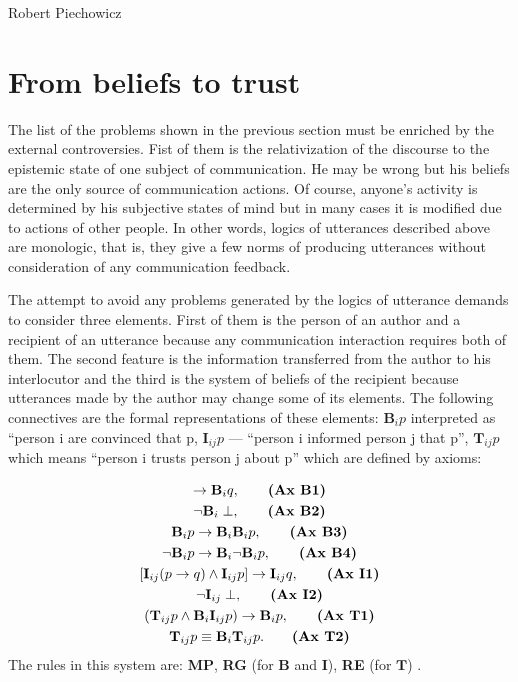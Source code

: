 \begin{artengenv}{Robert Piechowicz}
\section{From beliefs to trust}

\indent The list of the problems shown in the previous section must be enriched by the external controversies. Fist of them is the relativization of the discourse to the epistemic state of one subject of communication. He may be wrong but his beliefs are the only source of communication actions. Of course, anyone’s activity is determined by his subjective states of mind but in many cases it is modified due to actions of other people. In other words, logics of utterances described above are monologic, that is, they give a few norms of producing utterances without consideration of any communication feedback.

The attempt to avoid any problems generated by the logics of utterance demands to consider three elements. First of them is the person of an author and a recipient of an utterance because any communication interaction requires both of them. The second feature is the information transferred from the author to his interlocutor and the third is the system of beliefs of the recipient because utterances made by the author may change some of its elements. The following connectives are the formal representations of these elements: $\textbf{B}_{i}p$ interpreted as ``person i are convinced that p, $\textbf{I}_{ij}p$ --- ``person i informed person j that p'', $\textbf{T}_{ij}p$ which means ``person i trusts person j about p'' which are defined by axioms:

\begin{gather}
[\mathbf{B}_{i}(p\rightarrow q)\wedge \mathbf{B}_{i}p]\rightarrow \mathbf{B}_{i}q,\tag*{\textbf{(Ax B1)}}\\
\neg \mathbf{B}_{i}\perp,\tag*{\textbf{(Ax B2)}}\\
\mathbf{B}_{i}p\rightarrow \mathbf{B}_{i}\mathbf{B}_{i}p,\tag*{\textbf{(Ax B3)}}\\
\neg \mathbf{B}_{i}p\rightarrow \mathbf{B}_{i}\neg \mathbf{B}_{i}p,\tag*{\textbf{(Ax B4)}}\\
[\mathbf{I}_{ij}(p\rightarrow q)\wedge \mathbf{I}_{ij}p]\rightarrow \mathbf{I}_{ij}q,\tag*{\textbf{(Ax I1)}}\\
\neg \mathbf{I}_{ij}\perp,\tag*{\textbf{(Ax I2)}}\\
(\mathbf{T}_{ij}p\wedge \mathbf{B}_{i}\mathbf{I}_{ij}p)\rightarrow \mathbf{B}_{i}p,\tag*{\textbf{(Ax T1)}}\\
\mathbf{T}_{ij}p\equiv \mathbf{B}_{i}\mathbf{T}_{ij}p.\tag*{\textbf{(Ax T2)}}
\end{gather}
The rules in this system are: \textbf{MP}, \textbf{RG} (for $\mathbf{B}$ and $\mathbf{I}$), \textbf{RE} (for $\mathbf{T}$)
\parencite[see][p.32n]{liau_belief_2003}.


\end{artengenv}
